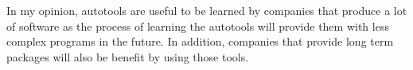 \documentclass[11pt]{article}
\begin{document}
In my opinion, autotools are useful to be learned by companies that produce a lot of software as the process of learning the autotools will provide them with less complex programs in the future. In addition, companies that provide long term packages will also be benefit by using those tools.
\nocite{*}


\end{document}
